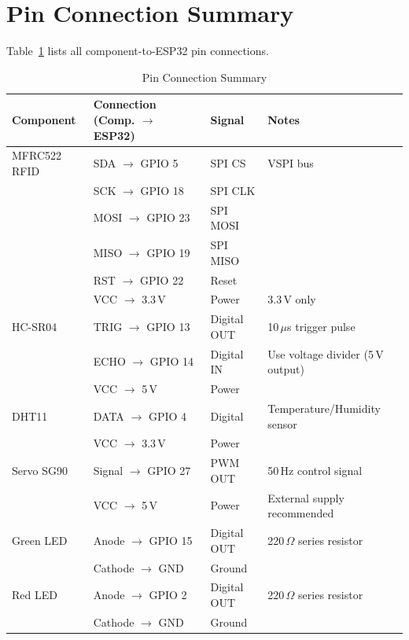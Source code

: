 \documentclass[12pt,a4paper]{report}
\begin{document}
\section{Pin Connection Summary}

Table~\ref{tab:pins} lists all component-to-ESP32 pin connections.

\begin{table}[h!]
\centering
\caption{Pin Connection Summary}
\label{tab:pins}
\renewcommand{\arraystretch}{1.3}

\begin{tabular}{|p{3.5cm}|p{4cm}|p{1.8cm}|p{3.5cm}|}
\hline
\textbf{Component} & \textbf{Connection (Comp. $\rightarrow$ ESP32)} & \textbf{Signal} & \textbf{Notes} \\
\hline

MFRC522 RFID & SDA $\rightarrow$ GPIO 5 & SPI CS & VSPI bus \\
\hline
& SCK $\rightarrow$ GPIO 18 & SPI CLK & \\
\hline
& MOSI $\rightarrow$ GPIO 23 & SPI MOSI & \\
\hline
& MISO $\rightarrow$ GPIO 19 & SPI MISO & \\
\hline
& RST $\rightarrow$ GPIO 22 & Reset & \\
\hline
& VCC $\rightarrow$ 3.3\,V & Power & 3.3\,V only \\
\hline

HC-SR04 & TRIG $\rightarrow$ GPIO 13 & Digital OUT & 10\,$\mu$s trigger pulse \\
\hline
& ECHO $\rightarrow$ GPIO 14 & Digital IN & Use voltage divider (5\,V output) \\
\hline
& VCC $\rightarrow$ 5\,V & Power & \\
\hline

DHT11 & DATA $\rightarrow$ GPIO 4 & Digital & Temperature/Humidity sensor \\
\hline
& VCC $\rightarrow$ 3.3\,V & Power & \\
\hline

Servo SG90 & Signal $\rightarrow$ GPIO 27 & PWM OUT & 50\,Hz control signal \\
\hline
& VCC $\rightarrow$ 5\,V & Power & External supply recommended \\
\hline

Green LED & Anode $\rightarrow$ GPIO 15 & Digital OUT & 220\,$\Omega$ series resistor \\
\hline
& Cathode $\rightarrow$ GND & Ground & \\
\hline

Red LED & Anode $\rightarrow$ GPIO 2 & Digital OUT & 220\,$\Omega$ series resistor \\
\hline
& Cathode $\rightarrow$ GND & Ground & \\
\hline

\end{tabular}

\end{table}
\end{document}
